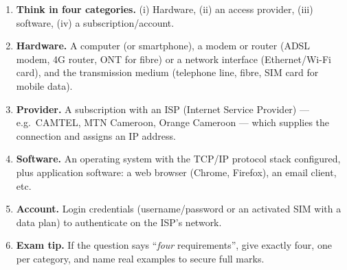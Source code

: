 \documentclass[11pt]{article}
\newcommand{\cle}[1]{{\popxbold\color{popdark}#1}}
\begin{document}
\begin{methode}
\begin{enumerate}
\item \textbf{Think in four categories.} (i) Hardware, (ii) an access provider, (iii) software, (iv) a subscription/account.
\item \textbf{Hardware.} A computer (or smartphone), a \cle{modem} or router (ADSL modem, 4G router, ONT for fibre) or a network interface (Ethernet/Wi-Fi card), and the transmission medium (telephone line, fibre, SIM card for mobile data).
\item \textbf{Provider.} A subscription with an \cle{ISP} (Internet Service Provider) — e.g.\ CAMTEL, MTN Cameroon, Orange Cameroon — which supplies the connection and assigns an IP address.
\item \textbf{Software.} An operating system with the TCP/IP protocol stack configured, plus application software: a web browser (Chrome, Firefox), an email client, etc.
\item \textbf{Account.} Login credentials (username/password or an activated SIM with a data plan) to authenticate on the ISP's network.
\item \textbf{Exam tip.} If the question says ``\emph{four} requirements'', give exactly four, one per category, and name real examples to secure full marks.
\end{enumerate}
\end{methode}
\end{document}
